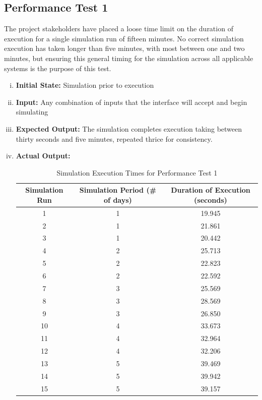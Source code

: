 \documentclass[paper=letter, fontsize=10pt]{scrartcl}
\numberwithin{equation}{section}		%
\numberwithin{figure}{section}			%
\numberwithin{table}{section}				%
\begin{document}
\begin{enumerate}[(i)]
\subsection{Performance Test 1}
The project stakeholders have placed a loose time limit on the duration of execution for a single simulation run of fifteen minutes. No correct simulation execution has taken longer than five minutes, with most between one and two minutes, but ensuring this general timing for the simulation across all applicable systems is the purpose of this test.
\begin{enumerate}[(i)]
	\item \textbf{Initial State:} Simulation prior to execution 
	\item \textbf{Input:} Any combination of inputs that the interface will accept and begin simulating
	\item \textbf{Expected Output:} The simulation completes execution taking between thirty seconds and five minutes, repeated thrice for consistency.
	\item \textbf{Actual Output:}
	\begin{table}
	\caption{Simulation Execution Times for Performance Test 1}
	\begin{center}
    	\begin{tabular}{| c | c | c |}
    		\hline
        	Simulation Run & Simulation Period (\# of days) & Duration of Execution (seconds) \\ \hline
  			1 & 1 & 19.945 \\ \hline
  			2 & 1 & 21.861 \\ \hline
  			3 & 1 & 20.442 \\ \hline
  			4 & 2 & 25.713 \\ \hline
  			5 & 2 & 22.823 \\ \hline
  			6 & 2 & 22.592 \\ \hline
  			7 & 3 & 25.569 \\ \hline
  			8 & 3 & 28.569 \\ \hline
  			9 & 3 & 26.850 \\ \hline
  			10 & 4 & 33.673 \\ \hline
  			11 & 4 & 32.964 \\ \hline
  			12 & 4 & 32.206 \\ \hline
  			13 & 5 & 39.469 \\ \hline
  			14 & 5 & 39.942 \\ \hline
  			15 & 5 & 39.157 \\ \hline
    	\end{tabular}
	\end{center}
	\end{table}
		

\end{enumerate}
\end{enumerate}
\end{document}
